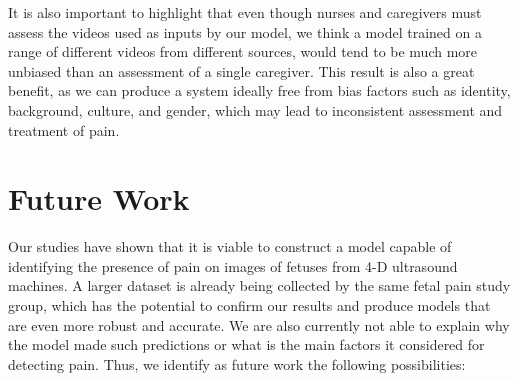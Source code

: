 It is also important to highlight that even though nurses and caregivers must assess the videos used as inputs by our model, we think a model trained on a range of different videos from different sources, would tend to be much more unbiased than an assessment of a single caregiver. This result is also a great benefit, as we can produce a system ideally free from bias factors such as identity, background, culture, and gender, which may lead to inconsistent assessment and treatment of pain.

\section{Future Work}

Our studies have shown that it is viable to construct a model capable of identifying the presence of pain on images of fetuses from 4-D ultrasound machines. A larger dataset is already being collected by the same fetal pain study group, which has the potential to confirm our results and produce models that are even more robust and accurate. We are also currently not able to explain why the model made such predictions or what is the main factors it considered for detecting pain. Thus, we identify as future work the following possibilities:


